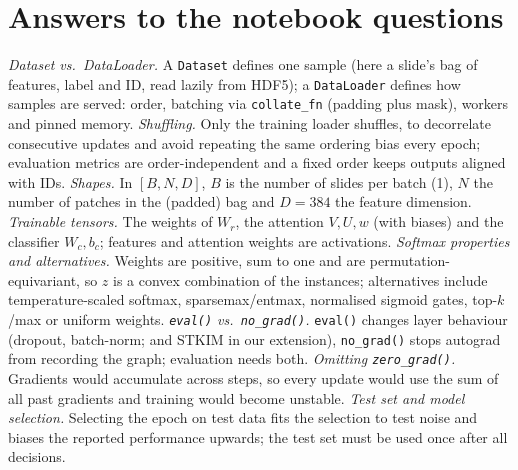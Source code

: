 \documentclass[conference]{IEEEtran}
\begin{document}
\section{Answers to the notebook questions}\label{app:answers}
\emph{Dataset vs.\ DataLoader.} A \texttt{Dataset} defines one sample (here a slide's bag of features, label and ID, read lazily from HDF5); a \texttt{DataLoader} defines how samples are served: order, batching via \texttt{collate\_fn} (padding plus mask), workers and pinned memory.
\emph{Shuffling.} Only the training loader shuffles, to decorrelate consecutive updates and avoid repeating the same ordering bias every epoch; evaluation metrics are order-independent and a fixed order keeps outputs aligned with IDs.
\emph{Shapes.} In $[B,N,D]$, $B$ is the number of slides per batch (1), $N$ the number of patches in the (padded) bag and $D{=}384$ the feature dimension.
\emph{Trainable tensors.} The weights of $W_r$, the attention $V,U,w$ (with biases) and the classifier $W_c,b_c$; features and attention weights are activations.
\emph{Softmax properties and alternatives.} Weights are positive, sum to one and are permutation-equivariant, so $z$ is a convex combination of the instances; alternatives include temperature-scaled softmax, sparsemax/entmax, normalised sigmoid gates, top-$k$/max or uniform weights.
\emph{\texttt{eval()} vs.\ \texttt{no\_grad()}.} \texttt{eval()} changes layer behaviour (dropout, batch-norm; and STKIM in our extension), \texttt{no\_grad()} stops autograd from recording the graph; evaluation needs both.
\emph{Omitting \texttt{zero\_grad()}.} Gradients would accumulate across steps, so every update would use the sum of all past gradients and training would become unstable.
\emph{Test set and model selection.} Selecting the epoch on test data fits the selection to test noise and biases the reported performance upwards; the test set must be used once after all decisions.
\end{document}
